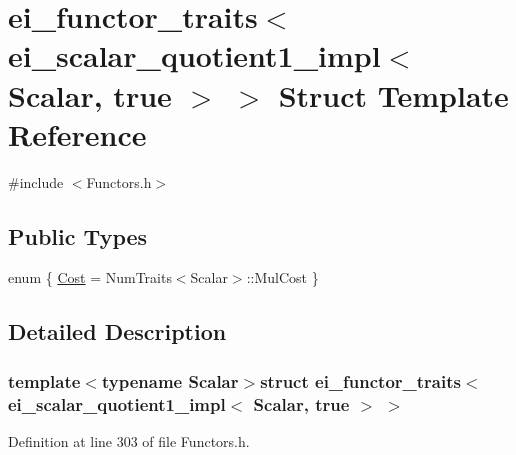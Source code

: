 \hypertarget{structei__functor__traits_3_01ei__scalar__quotient1__impl_3_01_scalar_00_01true_01_4_01_4}{\section{ei\-\_\-functor\-\_\-traits$<$ ei\-\_\-scalar\-\_\-quotient1\-\_\-impl$<$ Scalar, true $>$ $>$ Struct Template Reference}
\label{structei__functor__traits_3_01ei__scalar__quotient1__impl_3_01_scalar_00_01true_01_4_01_4}
}


{\ttfamily \#include $<$Functors.\-h$>$}

\subsection*{Public Types}
\begin{DoxyCompactItemize}
\item 
enum \{ \hyperlink{structei__functor__traits_3_01ei__scalar__quotient1__impl_3_01_scalar_00_01true_01_4_01_4_a7b3ed83b8cfdb224ae11a0665753feabaffb15a9ff6d87444eccd53b23206db78}{Cost} = Num\-Traits$<$Scalar$>$\-:\-:Mul\-Cost
 \}
\end{DoxyCompactItemize}


\subsection{Detailed Description}
\subsubsection*{template$<$typename Scalar$>$struct ei\-\_\-functor\-\_\-traits$<$ ei\-\_\-scalar\-\_\-quotient1\-\_\-impl$<$ Scalar, true $>$ $>$}



Definition at line 303 of file Functors.\-h.



